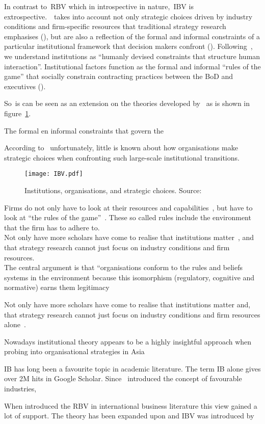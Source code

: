 In contrast to~\gls{RBV}  which in introspective in nature,~\gls{IBV} is extrospective.~\ibv~takes into account not only strategic choices driven by industry conditions and firm-specific resources that traditional strategy research emphasises (\cite{Barney:1991,Porter:1980}), but are also a reflection
of the formal and informal constraints of a particular institutional framework that decision
makers confront (\cite{Oliver:1997,Scott:2001}). Following~\cite{North:1990}, we understand institutions as “humanly devised constraints
that structure human interaction”. Institutional factors function as the formal and
informal “rules of the game” that socially constrain
contracting practices between the \gls{BoD} and executives (\cite{North:1990}).  


So~\ibv is can be seen as an extension on the theories developed by~\cite{Barney:1991,Porter:1980} as is shown in figure~\ref{fig:ibv}. 

The formal en informal constraints that govern the 


According to~\cite{Peng:2003} unfortunately, little is known about how organisations make strategic choices when confronting such large-scale institutional transitions.
\begin{figure}[htbp!] 
	\centering
	\texttt{[image: IBV.pdf]}
 	\caption{Institutions, organisations, and strategic choices.
Source: \cite{peng:2000}}
	\label{fig:ibv}
\end{figure}

 Firms do not only have to look at their resources and capabilities~\cite{Barney:1991}, but have to look at ``the rules of the game''~\cite{Scott:2001}. These so called rules include the environment that the firm \mne has to adhere to.\\


Not only have   more scholars have come to realise that institutions matter~\cite{Powell:1991,Scott:2001}, and that strategy research cannot just focus on industry conditions and firm resources.\\

The central argument is that “organisations conform to the rules and beliefs systems in the environment because this isomorphism (regulatory, cognitive and normative) earns them legitimacy


Not only have more scholars have come to realise that institutions matter and, that strategy research cannot just focus on industry conditions and firm resources alone~\cite{Powell:1991,Scott:2001}.

Nowadays institutional theory appears to be a highly insightful approach when probing into organisational strategies in Asia~\cite{Hoskisson:2000}



\Gls{IB} has long been a favourite topic in academic literature. The term \gls{IB} alone gives over 2M hits in Google Scholar. Since~\cite{Porter:1980} introduced the concept of favourable industries, 

When introduced the \gls{RBV} in international business literature this view gained a lot of support. 
The theory has been expanded upon and \gls{IBV} was introduced by~\cite{Kostova:1999,Meyer:2009,Wang:2012}
